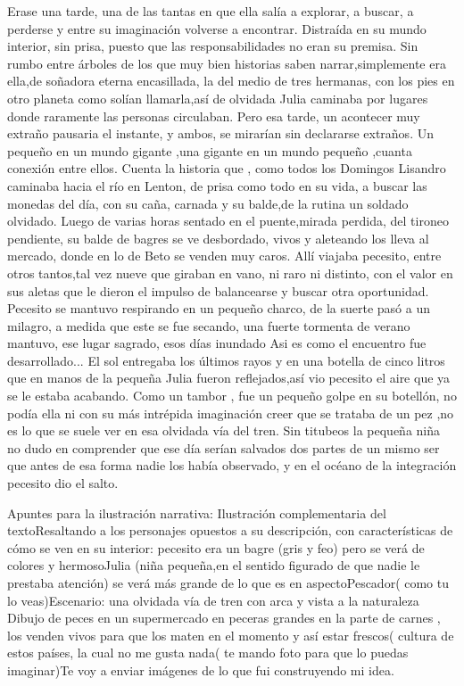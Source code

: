 \documentclass[12pt, a4paper, twoside]{book} %
\begin{document}
Erase una tarde, una de las tantas en que ella salía a explorar, a buscar, a perderse y entre su imaginación volverse a encontrar. Distraída en su mundo interior, sin prisa, puesto que las responsabilidades no eran su premisa. Sin rumbo entre árboles de los que muy bien  historias saben narrar,simplemente era ella,de soñadora eterna encasillada,  la del medio de tres hermanas, con los pies en otro planeta como solían llamarla,así de olvidada Julia caminaba por lugares donde raramente las personas circulaban.
Pero esa tarde, un acontecer muy extraño  pausaria el instante, y ambos, se mirarían sin declararse extraños.
Un pequeño en un mundo gigante ,una gigante en un mundo pequeño ,cuanta conexión entre ellos.
Cuenta la historia que , como todos los Domingos Lisandro caminaba hacia el río en Lenton,  de prisa como todo en su vida, a buscar las monedas del día, con su caña, carnada y su balde,de la rutina un soldado olvidado.
Luego de varias horas sentado en el puente,mirada perdida, del tironeo pendiente, su balde de bagres se ve desbordado, vivos y aleteando los lleva al mercado, donde en lo de Beto se venden muy caros.
Allí viajaba pecesito, entre otros tantos,tal vez nueve que giraban en vano, ni raro ni distinto, con el valor en sus aletas que le dieron el impulso de balancearse y buscar otra oportunidad.
Pecesito se mantuvo respirando en un pequeño charco, de la suerte pasó a un milagro, a medida que este se fue secando, una fuerte tormenta de verano mantuvo, ese lugar sagrado, esos días inundado
Asi es como el encuentro fue desarrollado...
El sol entregaba los últimos rayos y en una botella de cinco litros que  en manos de la pequeña Julia  fueron reflejados,así vio pecesito el aire que ya se le estaba acabando.
Como un tambor , fue un pequeño golpe en su botellón, no podía ella ni  con su más intrépida imaginación creer que se trataba de un pez ,no es lo que se suele ver en esa olvidada vía del tren.
Sin titubeos la pequeña niña no dudo en comprender que ese día serían salvados dos partes de un mismo ser que antes de esa forma nadie los había observado, y en el océano de la integración pecesito dio el salto.

Apuntes para la ilustración narrativa: Ilustración complementaria del textoResaltando a los personajes opuestos a su descripción,  con características de cómo se ven en su interior: pecesito era un bagre (gris y feo) pero se verá de colores y hermosoJulia (niña pequeña,en el sentido figurado de que nadie le prestaba atención) se verá más grande de lo que es en aspectoPescador( como tu lo veas)Escenario: una olvidada vía de tren con arca y vista a la naturaleza  Dibujo de peces en un supermercado en peceras grandes en la parte de carnes , los venden vivos para que los maten en el momento y así estar frescos( cultura de estos países, la cual no me gusta nada( te mando foto para que lo puedas imaginar)Te voy a enviar imágenes de lo que fui construyendo mi idea.
\end{document}
